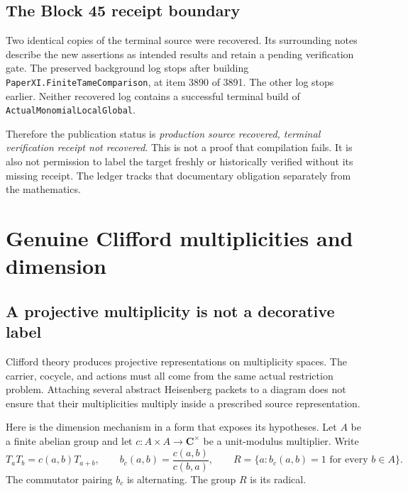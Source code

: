 \documentclass[11pt]{article}
\theoremstyle{definition}\newtheorem{definition}[proposition]{Definition}
\newcommand{\C}{\mathbf C}
\begin{document}
\subsection{The Block 45 receipt boundary}
Two identical copies of the terminal source were recovered. Its surrounding notes describe the new assertions as intended results and retain a pending verification gate. The preserved background log stops after building \texttt{PaperXI.FiniteTameComparison}, at item 3890 of 3891. The other log stops earlier. Neither recovered log contains a successful terminal build of \texttt{ActualMonomialLocalGlobal}.

Therefore the publication status is \emph{production source recovered, terminal verification receipt not recovered}. This is not a proof that compilation fails. It is also not permission to label the target freshly or historically verified without its missing receipt. The ledger tracks that documentary obligation separately from the mathematics.

\section{Genuine Clifford multiplicities and dimension}\label{sec:clifford}
\subsection{A projective multiplicity is not a decorative label}
Clifford theory produces projective representations on multiplicity spaces. The carrier, cocycle, and actions must all come from the same actual restriction problem. Attaching several abstract Heisenberg packets to a diagram does not ensure that their multiplicities multiply inside a prescribed source representation.

Here is the dimension mechanism in a form that exposes its hypotheses. Let $A$ be a finite abelian group and let $c:A\times A\to\C^\times$ be a unit-modulus multiplier. Write
\[
 T_aT_b=c(a,b)T_{a+b},\qquad
 b_c(a,b)=\frac{c(a,b)}{c(b,a)},\qquad
 R=\{a:b_c(a,b)=1\text{ for every }b\in A\}.
\]
The commutator pairing $b_c$ is alternating. The group $R$ is its radical.
\end{document}

